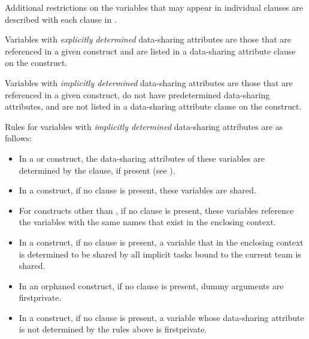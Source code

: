 Additional restrictions on the variables that may appear in individual clauses are 
described with each clause in .

Variables with \emph{explicitly determined} data-sharing attributes are those that are referenced 
in a given construct and are listed in a data-sharing attribute clause on the construct.

Variables with \emph{implicitly determined} data-sharing attributes are those that are referenced 
in a given construct, do not have predetermined data-sharing attributes, and are not 
listed in a data-sharing attribute clause on the construct.

Rules for variables with \emph{implicitly determined} data-sharing attributes are as follows:

\begin{itemize}
\item In a  or  construct, the data-sharing attributes of these variables are 
determined by the  clause, if present (see 
). 

\item In a  construct, if no  clause is present, these variables are 
shared.

\item For constructs other than , if no  clause is present, these variables reference the variables with the same names that exist in the enclosing context.

\item In a  construct, if no  clause is present, a variable that in the 
enclosing context is determined to be shared by all implicit tasks bound to the current 
team is shared.
\end{itemize}

\begin{samepage}
\fortranspecificstart
\begin{itemize}
\item In an orphaned  construct, if no  clause is present, dummy arguments 
are firstprivate.
\end{itemize}
\fortranspecificend
\end{samepage}

\begin{itemize}
\item In a  construct, if no  clause is present, a variable whose data-sharing 
attribute is not determined by the rules above is firstprivate.
\end{itemize}

